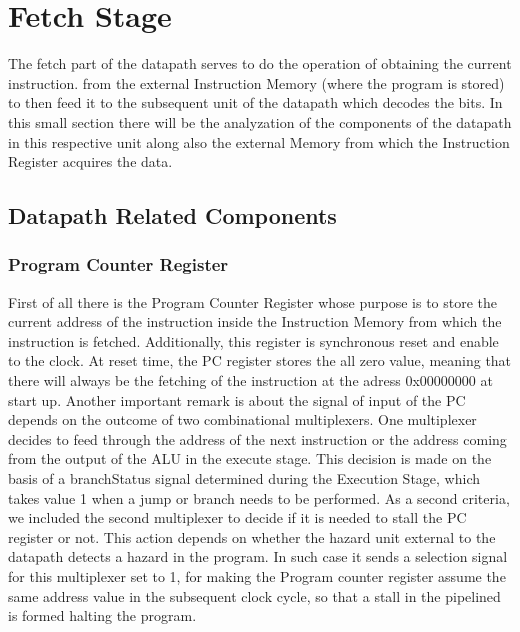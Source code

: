 %
\chapter{Fetch Stage}
\label{FetchUnit}

The fetch part of the datapath serves to do the operation of obtaining the current instruction.
from the external Instruction Memory (where the program is stored) to then feed it to the subsequent unit of the datapath which decodes the bits.
In this small section there will be the analyzation of the components of the datapath in this respective unit along also the external Memory from which the Instruction Register acquires the data.


\section{Datapath Related Components}

\subsection{ Program Counter Register }
First of all there is the Program Counter Register whose purpose is to store the current address of the instruction inside the Instruction Memory from
which the instruction is fetched. Additionally, this register is synchronous reset and enable to the clock. At reset time, the PC register stores the 
all zero value, meaning that there will always be the fetching of the instruction at the adress 0x00000000 at start up. 
Another important remark is about the signal of input of the PC depends on the outcome of two combinational multiplexers. One multiplexer decides to
feed through the address of the next instruction or the address coming from the output of the ALU in the execute stage. This decision is made on the basis
of a branchStatus signal determined during the Execution Stage, which takes value 1 when a jump or branch needs to be performed.
As a second criteria, we included the second multiplexer to decide if it is needed to stall the PC register or not. This action depends on whether the hazard unit
external to the datapath detects a hazard in the program. In such case it sends a selection signal for this multiplexer set to 1, for making the Program 
counter register assume the same address value in the subsequent clock cycle, so that a stall in the pipelined is formed halting the program.

